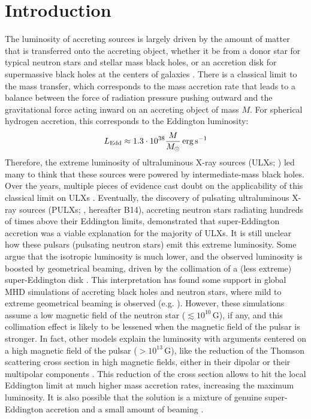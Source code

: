 \documentclass[twocolumn]{aastex631}
\newcommand{\ledd}{\ensuremath{L_{\rm Edd}}}
\newcommand{\msun}{\ensuremath{M_{\odot}}\xspace}
\begin{document}
\section{Introduction} \label{sec:intro}
The luminosity of accreting sources is largely driven by the amount of matter that is transferred onto the accreting object, whether it be from a donor star for typical neutron stars and stellar mass black holes, or an accretion disk for supermassive black holes at the centers of galaxies \citep{frankAccretionPowerAstrophysics2002}.
There is a classical limit to the mass transfer, which corresponds to the mass accretion rate that leads to a balance between the force of radiation pressure pushing outward and the gravitational force acting inward on an accreting object of mass $M$.
For spherical hydrogen accretion, this corresponds to the Eddington luminosity:
\begin{equation}
    \ledd \approx 1.3\cdot10^{38} \frac{M}{\msun}\,\mathrm{erg\,s^{-1}}
\end{equation}
Therefore, the extreme luminosity of ultraluminous X-ray sources (ULXs; \citealt{kaaretUltraluminousXRaySources2017,fabrikaUltraluminousXRaySources2021}) led many to think that these sources were powered by intermediate-mass black holes.
Over the years, multiple pieces of evidence cast doubt on the applicability of this classical limit on ULXs \citep{poutanenSupercriticallyAccretingStellar2007,gladstoneUltraluminousState2009,bachettiUltraluminousXRaySources2013}.
Eventually, the discovery of pulsating ultraluminous X-ray sources (PULXs; \citealt{bachettiUltraluminousXraySource2014}, hereafter B14), accreting neutron stars radiating hundreds of times above their Eddington limits, demonstrated that super-Eddington accretion was a viable explanation for the majority of ULXs.
It is still unclear how these pulsars (pulsating neutron stars) emit this extreme luminosity.
Some argue that the isotropic luminosity is much lower, and the observed luminosity is boosted by geometrical beaming, driven by the collimation of a (less extreme) super-Eddington disk \citep{kingPulsingULXsTip2017}.
This interpretation has found some support in global MHD simulations of accreting black holes and neutron stars, where mild to extreme geometrical beaming is observed (e.g. \citealt{jiangGlobalThreedimensionalRadiation2014,abarcaBeamedEmissionNeutronstar2021}).
However, these simulations assume a low magnetic field of the neutron star ($\lesssim10^{10}$\,G), if any, and this collimation effect is likely to be lessened when the magnetic field of the pulsar is stronger.
In fact, other models explain the luminosity with arguments centered on a high magnetic field of the pulsar ($>10^{13}$\,G), like the reduction of the Thomson scattering cross section in high magnetic fields, either in their dipolar \citep{mushtukovMaximumAccretionLuminosity2015, mushtukovOpticallyThickEnvelopes2017} or their multipolar components \citep{briceSupereddingtonEmissionAccreting2021}.
This reduction of the cross section allows to hit the local Eddington limit at much higher mass accretion rates, increasing the maximum luminosity.
It is also possible that the solution is a mixture of genuine super-Eddington accretion and a small amount of beaming \citep{israelAccretingPulsarExtreme2017}.
\end{document}
